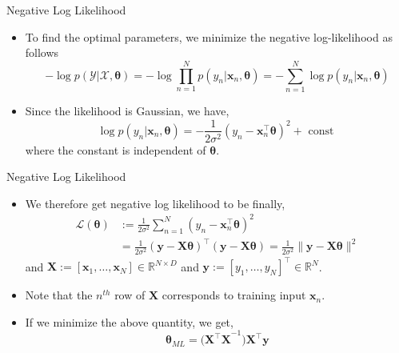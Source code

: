 \documentclass{beamer}
\begin{document}
\begin{frame}{Negative Log Likelihood}
\begin{itemize}[<+->]
\item To find the optimal parameters, we minimize the negative log-likelihood as follows
\begin{equation*}
-\log p(\mathcal{Y} | \mathcal{X}, \boldsymbol{\theta})=-\log \prod_{n=1}^{N} p\left(y_{n} | \boldsymbol{x}_{n}, \boldsymbol{\theta}\right)=-\sum_{n=1}^{N} \log p\left(y_{n} | \boldsymbol{x}_{n}, \boldsymbol{\theta}\right)
\end{equation*}
\item Since the likelihood is Gaussian, we have,
\begin{equation*}
\log p\left(y_{n} | \boldsymbol{x}_{n}, \boldsymbol{\theta}\right)=-\frac{1}{2 \sigma^{2}}\left(y_{n}-\boldsymbol{x}_{n}^{\top} \boldsymbol{\theta}\right)^{2}+\text { const }
\end{equation*}
where the constant is independent of $\boldsymbol{\theta}$. 
\end{itemize}
\end{frame}

\begin{frame}{Negative Log Likelihood}
\begin{itemize}
\item We therefore get negative log likelihood to be finally,
\begin{equation*}
\begin{aligned}
\mathcal{L}(\boldsymbol{\theta}) &:=\frac{1}{2 \sigma^{2}} \sum_{n=1}^{N}\left(y_{n}-\boldsymbol{x}_{n}^{\top} \boldsymbol{\theta}\right)^{2} \\
&=\frac{1}{2 \sigma^{2}}(\boldsymbol{y}-\boldsymbol{X} \boldsymbol{\theta})^{\top}(\boldsymbol{y}-\boldsymbol{X} \boldsymbol{\theta})=\frac{1}{2 \sigma^{2}}\|\boldsymbol{y}-\boldsymbol{X} \boldsymbol{\theta}\|^{2} 
\end{aligned}
\end{equation*}
and $\boldsymbol{X}:= [\boldsymbol{x}_1, \dots, \boldsymbol{x}_N] \in \mathbb{R}^{N \times D}$ and $\boldsymbol{y}:= [y_1, \dots, y_N]^{\top} \in \mathbb{R}^{N}$. 

\item Note that the $n^{th}$ row of $\boldsymbol{X}$ corresponds to training input $\boldsymbol{x}_n$. 
\item If we minimize the above quantity, we get, 
\begin{equation*}
    \boldsymbol{\theta}_{ML} = \big(\boldsymbol{X^{\top}X}^{-1}\big)\boldsymbol{X}^{\top}\boldsymbol{y}
\end{equation*}

 \end{itemize}
\end{frame}
\end{document}
